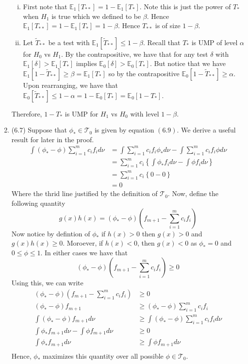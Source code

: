 \documentclass[12pt]{article}  %
\newcommand{\E}{{\mathbb{E}}}
\begin{document}
\begin{enumerate}
\begin{enumerate}[(i)]
\item First note that $\E_1[T_{**}] = 1-\E_1[T_{*}]$. Note this is just the power of $T_*$ when $H_1$ is true which we defined to be $\beta$. Hence  $\E_1[T_{**}] = 1-\E_1[T_{*}] = 1-\beta$. Hence $T_{**}$ is of size $1-\beta$.
\item Let $\tilde{T}_{**}$ be a test with $\E_1[\tilde{T}_{**}]\leq 1 - \beta$. Recall that $T_{*}$ is UMP of level $\alpha$ for $H_0$ vs $H_1$. By the contrapositive, we have that for any test $\delta$ with $\E_1[\delta]>\E_1[T_*]$ implies $\E_0[\delta]>\E_0[T_*]$. But notice that we have $\E_1[1-\tilde{T}_{**}]\geq \beta = \E_1[T_*]$ so by the contrapositive $\E_0[1-\tilde{T}_{**}]\geq \alpha$. Upon rearranging, we have that $\E_0[\tilde{T}_{**}]\leq 1 - \alpha = 1-\E_0[T_*] = \E_0[1-T_*]$. 
\end{enumerate}
Therefore, $1-T_{*}$ is UMP for $H_1$ vs $H_0$ with level $1-\beta$. 

\item (6.7) Suppose that $\phi_*\in\mathcal{T}_0$ is given by equation $(6.9)$. We derive a useful result for later in the proof. 
\begin{align*}
\int(\phi_* - \phi)\sum_{i=1}^mc_if_id\nu&= \int\sum_{i=1}^{m}c_if_i\phi_*d\nu - \int\sum_{i=1}^{m}c_if_i\phi d\nu\\
&= \sum_{i=1}^mc_i\left\{\int \phi_*f_id\nu - \int\phi f_id\nu\right\}\\
&=\sum_{i=1}^mc_i \left\{0-0\right\}\\
&= 0
\end{align*}
Where the thrid line justified by the definition of $\mathcal{T}_0$. Now, define the following quantity 
$$g(x)h(x) = (\phi_* - \phi)(f_{m+1} - \sum_{i=1}^m c_if_i)$$ Now notice by defintion of $\phi_*$ if $h(x)>0$ then $g(x)>0$ and $g(x)h(x)\geq 0$. Moroever, if $h(x)<0$, then $g(x)<0$ as $\phi_* = 0$ and $0\leq\phi\leq 1$. In either cases we have that $$(\phi_* - \phi)(f_{m+1} - \sum_{i=1}^m c_if_i)\geq 0$$ Using this, we can write 
\begin{align*}
(\phi_* - \phi)(f_{m+1} - \sum_{i=1}^m c_if_i)&\geq 0\\
(\phi_* - \phi)f_{m+1}&\geq (\phi_* - \phi)\sum_{i=1}^m c_if_i\\
\int (\phi_* - \phi)f_{m+1}d\nu&\geq \int(\phi_* - \phi)\sum_{i=1}^m c_if_id\nu\\
\int \phi_*f_{m+1}d\nu - \int \phi f_{m+1}d\nu&\geq 0\\
\int \phi_*f_{m+1}d\nu  &\geq \int \phi f_{m+1}d\nu\\
\end{align*}
Hence, $\phi_*$ maximizes this quantity over all possible $\phi\in\mathcal{T}_0$.


\end{enumerate}
\end{document}
